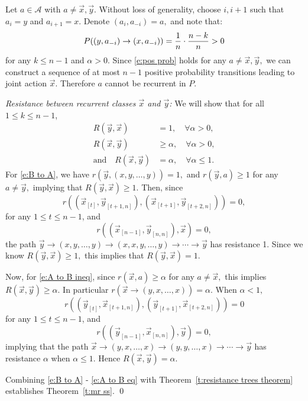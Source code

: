 Let $a\in\mathcal{A}$ with $a\neq \vec{x}, \vec{y}.$ Without loss of generality, choose $i,i+1$ such that $a_i = y$ and $a_{i+1} = x.$ Denote $(a_i,a_{-i}) = a,$ and note that:
\begin{equation}\label{e:pos prob}
P((y,a_{-i})\to (x,a_{-i})) = {1\over n}\cdot{n-k\over n}>0
\end{equation}
for any $k\leq n-1$ and $\alpha >0$.
Since \eqref{e:pos prob} holds for any $a\neq \vec{x},\vec{y},$ we can construct a sequence of at most $n-1$ positive probability transitions leading to joint action $\vec{x}$. Therefore $a$ cannot be recurrent in $P.$

\noindent\emph{Resistance between recurrent classes $\vec{x}$ and $ \vec{y}$:} We will show that for all $1\leq k\leq n-1$,
\begin{align}
R( \vec{y}, \vec{x}) &= 1,\quad\forall \alpha >0, \label{e:B to A}\\
R(\vec{x}, \vec{y}) &\geq \alpha,\quad\forall\alpha >0,\label{e:A to B ineq}\\
\text{and}\quad R(\vec{x}, \vec{y})&=\alpha, \quad \forall \alpha \leq 1.\label{e:A to B eq}
\end{align}
For \eqref{e:B to A}, we have
$r( \vec{y}, (x,y,\ldots,y)) = 1,$
and $r( \vec{y},a) \geq 1$ for any $a\neq  \vec{y},$ implying that $R( \vec{y}, \vec{x}) \geq 1.$ Then, since 
$$r\left((\vec{x}_{[t]}, \vec{y}_{[t+1,n]}),(\vec{x}_{[t+1]}, \vec{y}_{[t+2,n]}) \right)= 0,$$
for any $1\leq t\leq n-1$, and 
$$r\left((\vec{x}_{[n-1]}, \vec{y}_{[n,n]}),\vec{x}\right) = 0,$$ the path 
$ \vec{y}\to(x,y,\ldots,y)\to (x,x,y,\ldots,y)\to\cdots\to  \vec{y}$
has resistance 1. Since we know $R( \vec{y}, \vec{x}) \geq 1,$ this implies that $R( \vec{y}, \vec{x}) = 1.$

Now, for \eqref{e:A to B ineq}, since $r(\vec{x}, a)\geq \alpha$
for any $a\neq \vec{x},$ this implies $R(\vec{x}, \vec{y}) \geq \alpha.$ In particular $r(\vec{x}\to (y,x,\ldots,x)) = \alpha.$ When $\alpha <1,$ 
$$r\left(( \vec{y}_{[t]},\vec{x}_{[t+1,n]}),( \vec{y}_{[t+1]},\vec{x}_{[t+2,n]})\right) = 0$$
for any $1\leq t\leq n-1$, and
$$r\left(( \vec{y}_{[n-1]},\vec{x}_{[n,n]}), \vec{y}\right) = 0,$$
implying that the path 
$\vec{x}\to (y,x,\ldots,x)\to (y,y,\ldots,x)\to\cdots\to  \vec{y}$
has resistance $\alpha$ when $\alpha \leq 1.$ Hence $R(\vec{x}, \vec{y}) = \alpha.$

Combining \eqref{e:B to A} - \eqref{e:A to B eq} with Theorem~\ref{t:resistance trees theorem} establishes Theorem~\ref{t:mr ss}.
\hfill\qed

